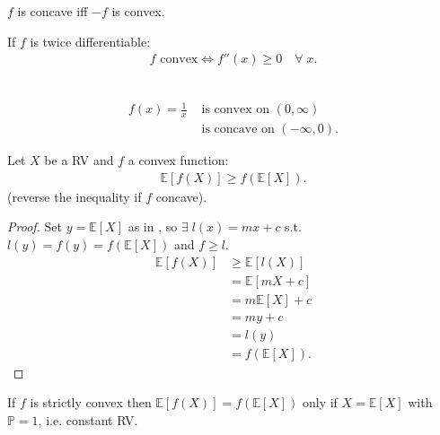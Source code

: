 \begin{definition}
    $f$ is concave iff $-f$ is convex.
\end{definition} 

\begin{claim}
    If $f$ is twice differentiable:
    \begin{align*}
        f \text{ convex} \iff f''(x) \geq 0 \quad \forall \; x.
    \end{align*} 
\end{claim} 

\begin{example} ~\vspace*{-1.5\baselineskip}
    \begin{align*}
        f(x) = \frac{1}{x} &\text{ is convex on } (0, \infty) \\
        &\text{ is concave on } (-\infty, 0).
    \end{align*} 
\end{example} 

\begin{theorem} \label{thm:jensen}
    Let $X$ be a RV and $f$ a convex function:
    \begin{align*}
        \mathbb{E}[f(X)] \geq f(\mathbb{E}[X]).
    \end{align*} 
    (reverse the inequality if $f$ concave).
\end{theorem} 

\begin{proof}
    Set $y = \mathbb{E}[X]$ as in , so $\exists \; l(x) = mx + c$ s.t. $l(y) = f(y) = f(\mathbb{E}[X])$ and $f \geq l$.
    \begin{align*}
        \mathbb{E}[f(X)] &\geq \mathbb{E}[l(X)] \\
        &= \mathbb{E}[mX + c] \\
        &= m \mathbb{E}[X] + c \\
        &= my + c \\
        &= l(y) \\
        &= f(\mathbb{E}[X]).
    \end{align*} 
\end{proof} 

\begin{claim}
    If $f$ is strictly convex then $\mathbb{E}[f(X)] = f(\mathbb{E}[X])$ only if $X = \mathbb{E}[X]$ with $\mathbb{P} = 1$, i.e. constant RV.
\end{claim} 

